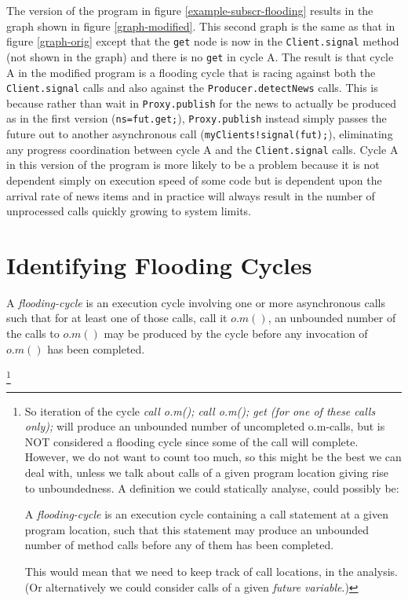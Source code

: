 \documentclass[12pt]{article}%
\begin{document}
The version of the program in figure \ref{example-subscr-flooding}
results in the graph shown in figure \ref{graph-modified}. This second graph is the same as that in figure \ref{graph-orig}
except that the \lstinline{get} node is now in the  \lstinline{Client.signal}
method (not shown in the graph) and there is no \lstinline{get} in cycle A. 
The result is that cycle A in the modified program
is a flooding cycle that is racing against both the
\lstinline{Client.signal} calls and also against the
\lstinline{Producer.detectNews} calls.  This is because rather than
wait in \lstinline{Proxy.publish} for the news to actually be produced
as in the first version (\lstinline{ns=fut.get;}),
\lstinline{Proxy.publish} instead simply passes the future out to
another asynchronous call (\lstinline{myClients!signal(fut);}),
eliminating any progress coordination between cycle A and the
\lstinline{Client.signal} calls. Cycle A in this version of the program is more likely to be a
problem because it is not dependent simply on execution speed of some
code but is dependent upon the arrival rate of news items and in
practice will always result in the number of unprocessed calls quickly
growing to system limits.

\section{Identifying Flooding Cycles}

\begin{definition}
\label{flooding-cycle}
A \emph{flooding-cycle} is an execution cycle 
involving one or more asynchronous calls
such that for at least one of those calls, call it $o.m()$,
an unbounded number of the calls to  $o.m()$ may be produced by the cycle
before any invocation of  $o.m()$ has been completed.
\end{definition}%
\footnote{So iteration of the cycle \emph{ call o.m(); call o.m(); get (for one of these calls only);} will produce an unbounded number of uncompleted o.m-calls, but is NOT considered a flooding cycle since some of the call will complete.
However, we do not want to count too much, so this might  be the best we can deal with, unless we talk about calls of a given  program location 
 giving rise to 
unboundedness. A definition we could statically analyse, could possibly be: 
\begin{definition}
\label{flooding-cycle2}
A \emph{flooding-cycle} is an execution cycle 
containing a call statement
 at a given program location, such that 
this statement may produce an unbounded number of  method calls  
before any of them %
 has been completed.
\end{definition}%
This would mean that we need to keep track of call locations,
in the analysis. (Or alternatively we could consider calls of a given  \emph{future variable}.)
}
\end{document}

